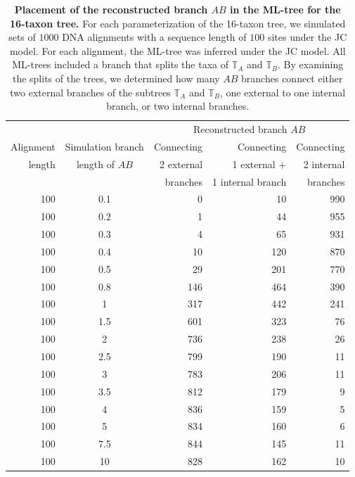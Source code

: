 \begin{appendices}
\begin{table}[hb]
    \centering
    \begin{tabular}{|r|c|r|r|r|}
\hline
 &  &\multicolumn{3}{c|}{Reconstructed branch $AB$}\\
Alignment &Simulation branch&   Connecting  & Connecting &  Connecting\\
length &length of $AB$ &     2 external & 1 external +  & 2 internal \\
&&     branches & 1 internal branch & branches\\
\hline
100	&0.1	&  0	& 10 & 990 \\
100	&0.2	&  1	& 44 & 955 \\
100	&0.3	&  4	& 65 & 931 \\
100	&0.4	& 10	&120 & 870 \\
100	&0.5	& 29	&201 & 770 \\
100	&0.8	&146	&464 & 390 \\
100	&1   	&317	&442 & 241 \\
100	&1.5	&601	&323  & 76 \\
100	&2  	&736	&238  & 26 \\
100	&2.5	&799	&190 &  11 \\
100	&3  	&783	&206 &  11 \\
100	&3.5	&812	&179 &   9 \\
100	&4      &836	&159 &   5 \\
100	&5  	&834	&160 &   6 \\
100	&7.5	&844	&145 &  11 \\
100	&10 	&828	&162 &  10 \\
\hline
    \end{tabular}
    \vspace{0.25cm}
    \caption{
        \textbf{Placement of the reconstructed branch $AB$ in the ML-tree for the 16-taxon tree.}
        For each parameterization of the 16-taxon tree, we simulated sets of $1000$ DNA alignments with a sequence length of $100$ sites under the JC model. For each alignment, the ML-tree was inferred under the JC model. All ML-trees included a branch that splits the taxa of $\mathbb{T}_A$ and $\mathbb{T}_B$. By examining the splits of the trees, we determined how many $AB$ branches connect either two external branches of the subtrees $\mathbb{T}_A$ and $\mathbb{T}_B$, one external to one internal branch, or two internal branches.
   }
    \label{supptab:bonferroni_correction}
    \end{table}\hfill\\


\end{appendices}
